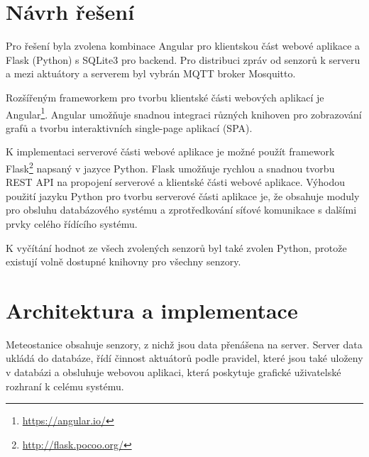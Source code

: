 \documentclass[11pt,a4paper]{article}
\begin{document}
%
%

\section{Návrh řešení}
Pro řešení byla zvolena kombinace Angular pro klientskou část webové aplikace a Flask (Python) s SQLite3 pro backend. Pro distribuci zpráv od senzorů k serveru a mezi aktuátory a serverem byl vybrán MQTT broker Mosquitto.

Rozšířeným frameworkem pro tvorbu klientské části webových aplikací je Angular\footnote{\url{https://angular.io/}}. Angular umožňuje snadnou integraci různých knihoven pro zobrazování grafů a tvorbu interaktivních single-page aplikací (SPA).

K implementaci serverové části webové aplikace je možné použít framework Flask\footnote{\url{http://flask.pocoo.org/}} napsaný v jazyce Python. Flask umožňuje rychlou a snadnou tvorbu REST API na propojení serverové a klientské části webové aplikace. Výhodou použití jazyku Python pro tvorbu serverové části aplikace je, že obsahuje moduly pro obsluhu databázového systému a zprotředkování síťové komunikace s dalšími prvky celého řídícího systému.

K vyčítání hodnot ze všech zvolených senzorů byl také zvolen Python, protože existují volně dostupné knihovny pro všechny senzory.

\section{Architektura a implementace}
Meteostanice obsahuje senzory, z nichž jsou data přenášena na server. Server data ukládá do databáze, řídí činnost aktuátorů podle pravidel, které jsou také uloženy v databázi a obsluhuje webovou aplikaci, která poskytuje grafické uživatelské rozhraní k celému systému.
\end{document}
